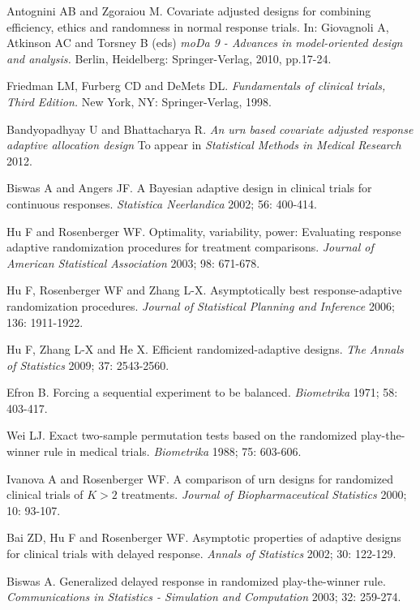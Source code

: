 \begin{thebibliography}
 Antognini AB and Zgoraiou M. Covariate adjusted designs for  combining efficiency, ethics and randomness in normal response trials. In: Giovagnoli A,  Atkinson AC and Torsney B (eds) \textit{moDa 9 - Advances in model-oriented design and analysis.} Berlin, Heidelberg: Springer-Verlag, 2010, pp.17-24.

 Friedman LM, Furberg CD and DeMets DL. \textit{Fundamentals of clinical trials, Third Edition.} New York, NY: Springer-Verlag, 1998.

 Bandyopadhyay U and Bhattacharya R. \textit{An urn based  covariate adjusted response adaptive allocation design} To appear in \textit{Statistical Methods in Medical Research} 2012.

 Biswas A and Angers JF.  A Bayesian adaptive design in clinical trials for continuous responses. \textit{Statistica Neerlandica} 2002; 56: 400-414.

 Hu F and  Rosenberger WF. Optimality, variability, power: Evaluating response adaptive randomization procedures for treatment comparisons. \textit{Journal of American Statistical Association} 2003; 98: 671-678.

 Hu F, Rosenberger WF and Zhang L-X.  Asymptotically best response-adaptive randomization procedures. \textit{Journal of Statistical Planning and Inference} 2006; 136: 1911-1922.

 Hu F, Zhang L-X and He X. Efficient randomized-adaptive designs. \textit{The Annals of Statistics} 2009; 37: 2543-2560.

 Efron B. Forcing a sequential experiment to be balanced. \textit{Biometrika} 1971; 58: 403-417.

 Wei LJ. Exact two-sample permutation tests based on the randomized play-the-winner rule in medical trials. \textit{Biometrika} 1988; 75: 603-606.

 Ivanova A and Rosenberger WF. A comparison of urn designs for randomized clinical trials of $K>2$ treatments. \textit{Journal of Biopharmaceutical Statistics} 2000; 10: 93-107.

 Bai ZD, Hu F and Rosenberger WF.  Asymptotic properties of adaptive designs for clinical trials with delayed response. \textit{Annals of Statistics} 2002; 30: 122-129.

 Biswas A. Generalized delayed response in randomized play-the-winner rule. \textit{Communications in Statistics - Simulation and Computation} 2003; 32: 259-274.


\end{thebibliography}
